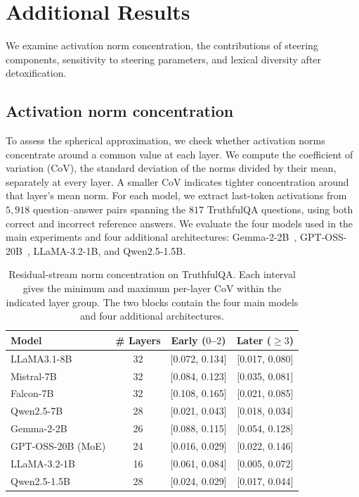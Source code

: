 \section{Additional Results}
\label{apx:additional-results}

We examine activation norm concentration, the contributions of steering components, sensitivity to steering parameters, and lexical diversity after detoxification.

\subsection{Activation norm concentration}
\label{appendix:norm_concentration}

To assess the spherical approximation, we check whether activation norms concentrate around a common value at each layer. We compute the coefficient of variation (CoV), the standard deviation of the norms divided by their mean, separately at every layer. A smaller CoV indicates tighter concentration around that layer's mean norm. For each model, we extract last-token activations from $5{,}918$ question--answer pairs spanning the $817$ TruthfulQA questions, using both correct and incorrect reference answers. We evaluate the four models used in the main experiments and four additional architectures: Gemma-2-2B~\cite{team2024gemma}, GPT-OSS-20B~\cite{agarwal2025gpt}, LLaMA-3.2-1B, and Qwen2.5-1.5B.

\begin{table}[ht]
\centering
\caption{Residual-stream norm concentration on TruthfulQA. Each interval gives the minimum and maximum per-layer CoV within the indicated layer group. The two blocks contain the four main models and four additional architectures.}
\small
\setlength{\tabcolsep}{5pt}
\begin{tabular}{@{}lccc@{}}
\toprule
\textbf{Model} & \textbf{\# Layers} & \textbf{Early ($0$--$2$)} & \textbf{Later ($\geq 3$)} \\
\midrule
LLaMA3.1-8B       & 32 & [0.072, 0.134] & [0.017, 0.080] \\
Mistral-7B        & 32 & [0.084, 0.123] & [0.035, 0.081] \\
Falcon-7B         & 32 & [0.108, 0.165] & [0.021, 0.085] \\
Qwen2.5-7B        & 28 & [0.021, 0.043] & [0.018, 0.034] \\
\midrule
Gemma-2-2B        & 26 & [0.088, 0.115] & [0.054, 0.128] \\
GPT-OSS-20B (MoE) & 24 & [0.016, 0.029] & [0.022, 0.146] \\
LLaMA-3.2-1B      & 16 & [0.061, 0.084] & [0.005, 0.072] \\
Qwen2.5-1.5B      & 28 & [0.024, 0.029] & [0.017, 0.044] \\
\bottomrule
\end{tabular}
\label{tab:norm_concentration}
\end{table}

